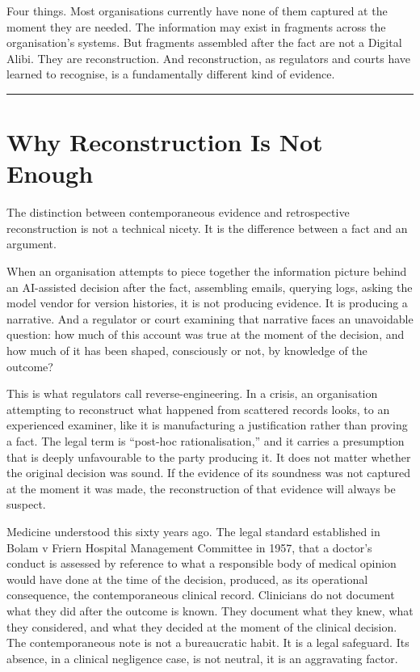Four things. Most organisations currently have none of them captured at the moment they are needed. The information may exist in fragments across the organisation's systems. But fragments assembled after the fact are not a Digital Alibi. They are reconstruction. And reconstruction, as regulators and courts have learned to recognise, is a fundamentally different kind of evidence.

\begin{center}\rule{0.5\linewidth}{0.5pt}\end{center}

\section{Why Reconstruction Is Not Enough}

The distinction between contemporaneous evidence and retrospective reconstruction is not a technical nicety. It is the difference between a fact and an argument.

When an organisation attempts to piece together the information picture behind an AI-assisted decision after the fact, assembling emails, querying logs, asking the model vendor for version histories, it is not producing evidence. It is producing a narrative. And a regulator or court examining that narrative faces an unavoidable question: how much of this account was true at the moment of the decision, and how much of it has been shaped, consciously or not, by knowledge of the outcome?

This is what regulators call reverse-engineering. In a crisis, an organisation attempting to reconstruct what happened from scattered records looks, to an experienced examiner, like it is manufacturing a justification rather than proving a fact. The legal term is ``post-hoc rationalisation,'' and it carries a presumption that is deeply unfavourable to the party producing it. It does not matter whether the original decision was sound. If the evidence of its soundness was not captured at the moment it was made, the reconstruction of that evidence will always be suspect.

Medicine understood this sixty years ago. The legal standard established in Bolam v Friern Hospital Management Committee in 1957, that a doctor's conduct is assessed by reference to what a responsible body of medical opinion would have done at the time of the decision, produced, as its operational consequence, the contemporaneous clinical record. Clinicians do not document what they did after the outcome is known. They document what they knew, what they considered, and what they decided at the moment of the clinical decision. The contemporaneous note is not a bureaucratic habit. It is a legal safeguard. Its absence, in a clinical negligence case, is not neutral, it is an aggravating factor.

